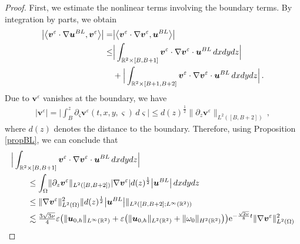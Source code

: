 \documentclass[pdflatex,sn-mathphys-num]{sn-jnl}%
\theoremstyle{thmstyleone}%
\theoremstyle{thmstyletwo}%
\theoremstyle{thmstylethree}%
\theoremstyle{thmstyletwo}
\begin{document}
\begin{proof}
	First, we estimate the nonlinear terms involving the boundary terms. By integration by parts, we obtain
	\begin{align*}
		\big|\big\langle{\boldsymbol v}^{\varepsilon} \cdot \nabla \boldsymbol{u}^{BL}
		,{\boldsymbol v}^{\varepsilon}\big\rangle\big|
		=&
		\big|\big\langle{\boldsymbol v}^{\varepsilon} \cdot \nabla{\boldsymbol v}^{\varepsilon},\boldsymbol{u}^{BL}\big\rangle\big|\\\notag
		\leq&\Big|\int_{\mathbb{R}^2\times[B,B+1]} {\boldsymbol v}^{\varepsilon} \cdot \nabla {\boldsymbol v}^{\varepsilon}\cdot
		\boldsymbol{u}^{BL}
		\,{d}x{d}y{d}z
		\Big|\\
		&+\Big|\int_{\mathbb{R}^2\times[B+1,B+2]} {\boldsymbol v}^{\varepsilon} \cdot \nabla {\boldsymbol v}^{\varepsilon}\cdot
		\boldsymbol{u}^{BL}
		\,{d}x{d}y{d}z\Big|\,.
	\end{align*}
	Due to ${\boldsymbol v}^{\varepsilon}$ vanishes at the boundary, we have
	\begin{align*}
		|{\boldsymbol v}^{\varepsilon}|
		=\Big| \int_B^z \partial_\varsigma {\boldsymbol v}^{\varepsilon}(t,x,y,\varsigma)\,{d}\varsigma\Big|
		\leq d(z)^{\frac{1}{2}}\lVert\partial_z {\boldsymbol v}^{\varepsilon}\rVert_{{L}^2([B,B+2])}\,,
	\end{align*}
	where $d(z)$ denotes the distance to the boundary.
	Therefore, using Proposition \ref{propBL},  we can conclude that
	\begin{align*}
		&\Big|\int_{\mathbb{R}^2\times[B,B+1]} {\boldsymbol v}^{\varepsilon} \cdot \nabla {\boldsymbol v}^{\varepsilon}\cdot
		\boldsymbol{u}^{BL}
		\,dxdydz
		\Big|
		\\
		&\qquad\leq \int_\Omega
		\lVert\partial_z {\boldsymbol v}^{\varepsilon}\rVert_{{L}^2([B,B+2])}
		|\nabla {\boldsymbol v}^{\varepsilon}|
		d(z)^{\frac{1}{2}}
		\big|\boldsymbol{u}^{BL}\big|\,{d}x{d}y{d}z\\
		&\qquad\leq  \lVert\nabla{\boldsymbol v}^{\varepsilon}\rVert^2_{{L}^2(\Omega)}
		\lVert d(z)^{\frac{1}{2}} \big|\boldsymbol{u}^{BL}\big| \rVert_{{L}^2([B,B+2];{L}^\infty(\mathbb{R}^2))}\\
		&\qquad\lesssim
		\tfrac{3\sqrt{3\nu}}{4}
		\varepsilon
		\big(
		\lVert{\boldsymbol{u}}_{0,h}\rVert_{L^\infty(\mathbb{R}^2)} 
		+\varepsilon\big(
		\lVert{\boldsymbol{u}}_{0,h}\rVert_{L^2(\mathbb{R}^2)}+\lVert{\omega}_0\rVert_{H^2(\mathbb{R}^2)}
		\big)
		\big)\mathrm{e}^{-\frac{\sqrt{2\nu}}{8}  t}
		\lVert\nabla{\boldsymbol v}^{\varepsilon}\rVert^2_{{L}^2(\Omega)}
		\notag\\

\end{align*}
\end{proof}
\end{document}
